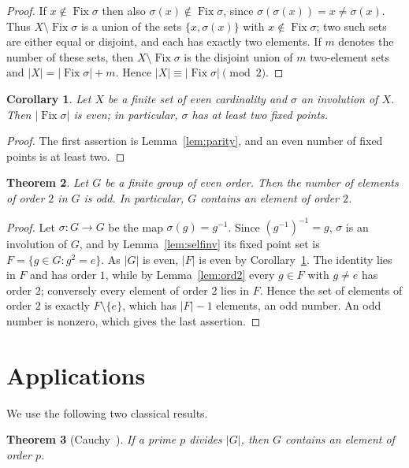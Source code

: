 \documentclass[11pt]{amsart}
\newtheorem{theorem}{Theorem}[section]
\newtheorem{corollary}[theorem]{Corollary}
\theoremstyle{definition}
\theoremstyle{remark}
\DeclareMathOperator{\Fix}{Fix}
\begin{document}
\begin{proof}
If $x\notin\Fix\sigma$ then also $\sigma(x)\notin\Fix\sigma$, since $\sigma(\sigma(x))=x\neq
\sigma(x)$. Thus $X\setminus\Fix\sigma$ is a union of the sets $\{x,\sigma(x)\}$ with
$x\notin\Fix\sigma$; two such sets are either equal or disjoint, and each has exactly two
elements. If $m$ denotes the number of these sets, then $X\setminus\Fix\sigma$ is the disjoint
union of $m$ two-element sets and $|X|=|\Fix\sigma|+m$. Hence $|X|\equiv|\Fix\sigma|\pmod 2$.
\end{proof}

\begin{corollary}\label{cor:fix}
Let $X$ be a finite set of even cardinality and $\sigma$ an involution of $X$. Then
$|\Fix\sigma|$ is even; in particular, $\sigma$ has at least two fixed points.
\end{corollary}

\begin{proof}
The first assertion is Lemma~\ref{lem:parity}, and an even number of fixed points is at least
two.
\end{proof}

\begin{theorem}\label{thm:main}
Let $G$ be a finite group of even order. Then the number of elements of order $2$ in $G$ is
odd. In particular, $G$ contains an element of order $2$.
\end{theorem}

\begin{proof}
Let $\sigma\colon G\to G$ be the map $\sigma(g)=g^{-1}$. Since $(g^{-1})^{-1}=g$, $\sigma$ is
an involution of $G$, and by Lemma~\ref{lem:selfinv} its fixed point set is
$F=\{g\in G: g^2=e\}$. As $|G|$ is even, $|F|$ is even by Corollary~\ref{cor:fix}. The
identity lies in $F$ and has order $1$, while by Lemma~\ref{lem:ord2} every $g\in F$ with
$g\neq e$ has order $2$; conversely every element of order $2$ lies in $F$. Hence the set of
elements of order $2$ is exactly $F\setminus\{e\}$, which has $|F|-1$ elements, an odd number.
An odd number is nonzero, which gives the last assertion.
\end{proof}

\section{Applications}\label{sec:app}

We use the following two classical results.

\begin{theorem}[Cauchy~\cite{Cauchy}]\label{thm:cauchy}
If a prime $p$ divides $|G|$, then $G$ contains an element of order $p$.
\end{theorem}
\end{document}
